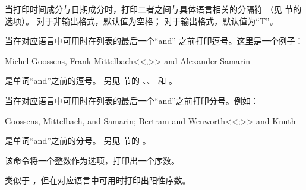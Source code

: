 \begin{ltxsyntax}

当打印时间成分与日期成分时，打印二者之间与具体语言相关的分隔符
（见  节的  选项）。
对于非输出格式，默认值为空格；
对于输出格式，默认值为“T”。


当在对应语言中可用时在列表的最后一个“and” 之前打印逗号。这里是一个例子：

\begin{ltxexample}
Michel Goossens, Frank Mittelbach<<,>> and Alexander Samarin
\end{ltxexample}
%
 是单词“and”之前的逗号。
另见  节的 、、 和 。


当在对应语言中可用时在列表的最后一个“and”之前打印分号。例如：

\begin{ltxexample}
Goossens, Mittelbach, and Samarin; Bertram and Wenworth<<;>> and Knuth
\end{ltxexample}
%
 是单词“and”之前的分号。
另见  节的 。


该命令将一个整数作为选项，打印出一个序数。


类似于 ，但在对应语言中可用时打印出阳性序数。


\end{ltxsyntax}
